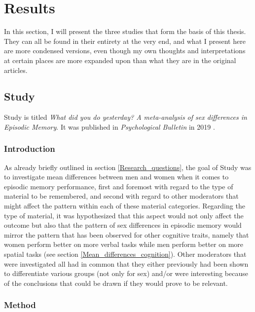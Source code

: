\section{Results} \label{Results}

In this section, I will present the three studies that form the basis of this thesis. They can all be found in their entirety at the very end, and what I present here are more condensed versions, even though my own thoughts and interpretations at certain places are more expanded upon than what they are in the original articles.

\subsection{Study } \label{Meta_study}

Study  is titled \emph{What did you do yesterday? A meta-analysis of sex differences in Episodic Memory}. It was published in \emph{Psychological Bulletin} in 2019 \parencite{Asperholm2019}.

\subsubsection{Introduction} \label{Meta_study_introduction}

As already briefly outlined in section \ref{Research_questions}, the goal of Study  was to investigate mean differences between men and women when it comes to episodic memory performance, first and foremost with regard to the type of material to be remembered, and second with regard to other moderators that might affect the pattern within each of these material categories. Regarding the type of material, it was hypothesized that this aspect would not only affect the outcome but also that the pattern of sex differences in episodic memory would mirror the pattern that has been observed for other cognitive traits, namely that women perform better on more verbal tasks while men perform better on more spatial tasks (see section \ref{Mean_differences_cognition}). Other moderators that were investigated all had in common that they either previously had been shown to differentiate various groups (not only for sex) and/or were interesting because of the conclusions that could be drawn if they would prove to be relevant.

\subsubsection{Method} \label{Study1_Method}

